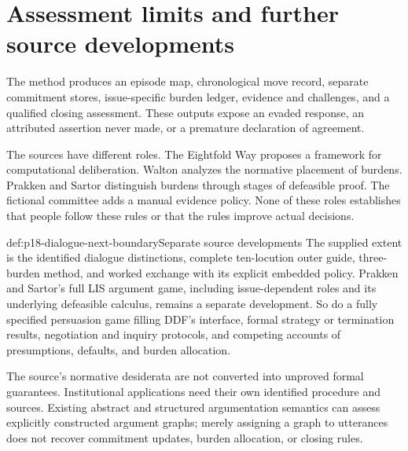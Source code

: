 \section{Assessment limits and further source developments}

The method produces an episode map, chronological move record, separate
commitment stores, issue-specific burden ledger, evidence and challenges,
and a qualified closing assessment. These outputs expose an evaded
response, an attributed assertion never made, or a premature declaration
of agreement.

The sources have different roles. The Eightfold Way proposes a framework
for computational deliberation. Walton analyzes the normative placement
of burdens. Prakken and Sartor distinguish burdens through stages of
defeasible proof. The fictional committee adds a manual evidence policy.
None of these roles establishes that people follow these rules or that
the rules improve actual decisions.

\begin{proofboundary}{def:p18-dialogue-next-boundary}{Separate source developments}
The supplied extent is the identified dialogue distinctions, complete
ten-locution outer guide, three-burden method, and worked exchange with
its explicit embedded policy. Prakken and Sartor's full LIS argument
game, including issue-dependent roles and its underlying defeasible
calculus, remains a separate development. So do a fully specified
persuasion game filling DDF's interface, formal strategy or termination
results, negotiation and inquiry protocols, and competing accounts
of presumptions, defaults, and burden allocation.

The source's normative desiderata are not converted into unproved
formal guarantees. Institutional applications need their own identified
procedure and sources. Existing abstract and structured argumentation
semantics can assess explicitly constructed argument graphs; merely
assigning a graph to utterances does not recover commitment updates,
burden allocation, or closing rules.
\end{proofboundary}

